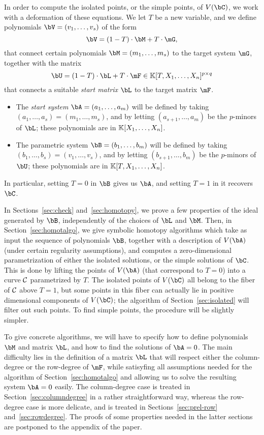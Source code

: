 \documentclass[12pt]{article}
\begin{document}
In order to compute the isolated points, or the simple points, of
$V(\bC)$, we work with a deformation of these equations.  We let $T$ be a
new variable, and we define 
polynomials $\bV=(v_1,\dots,v_s)$ of the form
\begin{equation}\label{eqdef:bV}
\bV = (1-T) \cdot \bM + T \cdot \mG,  
\end{equation}
that connect certain polynomials $\bM=(m_1,\dots,m_s)$ to the target
system $\mG$, together with 
the matrix
\begin{equation}\label{eqdef:bU}
\bU = (1-T)\cdot \bL + T \cdot \mF \in \KK[T, X_1,\dots,X_n]^{p \times q}  
\end{equation}
that connects a suitable \emph{start matrix} $\bL$ to the target matrix $\mF$.
\begin{itemize}
\item The {\em start system} $\bA=(a_1,\dots,a_m)$ will be defined by
  taking $(a_1,\dots,a_s) = (m_1,\dots,m_s)$, and by letting
  $(a_{s+1},\dots,a_m)$ be the $p$-minors of $\bL$; these polynomials 
  are in $\mathbb{K}[X_1,\dots,X_n]$. 
\item The parametric system $\bB=(b_1,\dots,b_m)$ will be defined by
  taking $(b_1,\dots,b_s) = (v_1,\dots,v_s)$, and by letting
  $(b_{s+1},\dots,b_m)$ be the $p$-minors of $\bU$; these polynomials 
  are in $\mathbb{K}[T,X_1,\dots,X_n]$. 
\end{itemize}
In particular, setting $T=0$ in $\bB$ gives us $\bA$, and 
setting $T=1$ in it recovers $\bC$.

In Sections~\ref{sec:check} and~\ref{sec:homotopy}, we prove a few
properties of the ideal generated by $\bB$, independently of the
choices of $\bL$ and $\bM$.  Then, in Section~\ref{sec:homotalgo}, we
give symbolic homotopy algorithms which take as input the sequence of
polynomials $\bB$, together with a description of $V(\bA)$ (under
certain regularity assumptions), and computes a zero-dimensional
parametrization of either the isolated solutions, or the simple
solutions of $\bC$. This is done by lifting the points of $V(\bA)$
(that correspond to $T=0$) into a curve $\cal C$ parametrized by
$T$. The isolated points of $V(\bC)$ all belong to the fiber of $\cal
C$ above $T=1$, but some points in this fiber can actually lie in
positive dimensional components of $V(\bC)$; the algorithm of
Section~\ref{sec:isolated} will filter out such points. To find simple
points, the procedure will be slightly simpler.

To give concrete algorithms, we will have to specify how to define
polynomials $\bM$ and matrix $\bL$, and how to find the solutions of 
$\bA=0$.
The main difficulty lies in the definition of a matrix
$\bL$ that will respect either the column-degree or the row-degree of
$\mF$, while satisyfing all assumptions needed for the algorithm of
Section~\ref{sec:homotalgo} and allowing us to solve
the resulting system $\bA=0$ easily.
  The column-degree case is treated in
Section~\ref{sec:columndegree} in a rather straightforward way,
whereas the row-degree case is more delicate, and is treated in
Sections~\ref{sec:prel-row} and~\ref{sec:rowdegree}. The proofs of
some properties needed in the latter sections are postponed to the
appendix of the paper.
\end{document}
